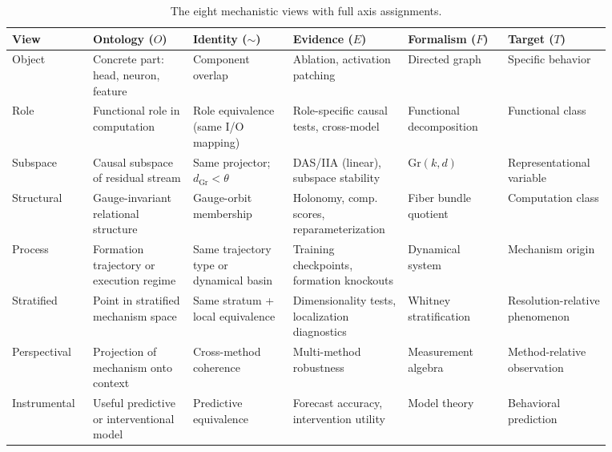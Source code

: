 \documentclass[11pt]{article}
\theoremstyle{remark}
\newcommand{\Gr}{\mathrm{Gr}}
\begin{document}
\begin{table}[ht]
\centering
\small
\setlength{\tabcolsep}{4pt}
\begin{tabular}{p{0.10\linewidth}p{0.15\linewidth}p{0.15\linewidth}p{0.17\linewidth}p{0.15\linewidth}p{0.15\linewidth}}
\toprule
\textbf{View} & \textbf{Ontology ($O$)} & \textbf{Identity ($\sim$)}
  & \textbf{Evidence ($E$)} & \textbf{Formalism ($F$)} & \textbf{Target ($T$)} \\
\midrule
Object
  & Concrete part: head, neuron, feature
  & Component overlap
  & Ablation, activation patching
  & Directed graph
  & Specific behavior \\[3pt]
Role
  & Functional role in computation
  & Role equivalence (same I/O mapping)
  & Role-specific causal tests, cross-model
  & Functional decomposition
  & Functional class \\[3pt]
Subspace
  & Causal subspace of residual stream
  & Same projector; $d_{\Gr} < \theta$
  & DAS/IIA (linear), subspace stability
  & $\Gr(k,d)$
  & Representational variable \\[3pt]
Structural
  & Gauge-invariant relational structure
  & Gauge-orbit membership
  & Holonomy, comp. scores, reparameterization
  & Fiber bundle quotient
  & Computation class \\[3pt]
Process
  & Formation trajectory or execution regime
  & Same trajectory type or dynamical basin
  & Training checkpoints, formation knockouts
  & Dynamical system
  & Mechanism origin \\[3pt]
Stratified
  & Point in stratified mechanism space
  & Same stratum + local equivalence
  & Dimensionality tests, localization diagnostics
  & Whitney stratification
  & Resolution-relative phenomenon \\[3pt]
Perspectival
  & Projection of mechanism onto context
  & Cross-method coherence
  & Multi-method robustness
  & Measurement algebra
  & Method-relative observation \\[3pt]
Instrumental
  & Useful predictive or interventional model
  & Predictive equivalence
  & Forecast accuracy, intervention utility
  & Model theory
  & Behavioral prediction \\
\bottomrule
\end{tabular}
\caption{The eight mechanistic views with full axis assignments.}
\label{tab:atlas}
\end{table}
\end{document}
